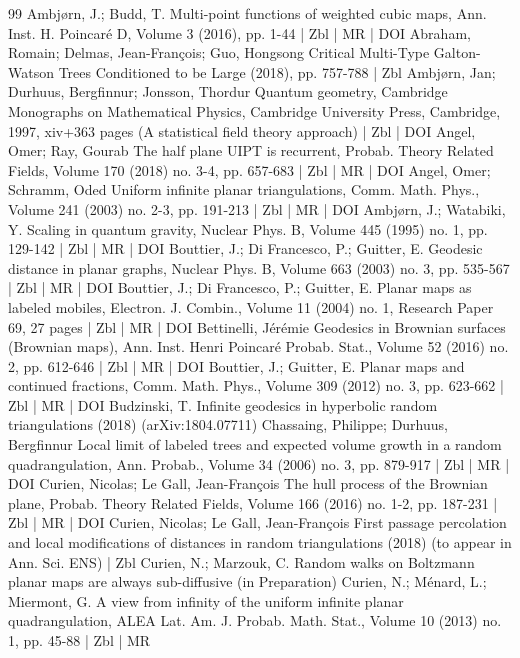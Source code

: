 \documentclass[10pt]{amsart}
\theoremstyle{definition}\newtheorem{defi}[theo]{Definition}\newtheorem{rema}[theo]{Remark}\newtheorem{exam}[theo]{Example}\newtheorem{exem}[theo]{Example}\newtheorem{nota}[theo]{Notation}
\begin{document}
\begin{thebibliography}{99}
Ambjørn, J.; Budd, T. Multi-point functions of weighted cubic maps, Ann. Inst. H. Poincaré D, Volume 3 (2016), pp. 1-44 | Zbl | MR | DOI
Abraham, Romain; Delmas, Jean-François; Guo, Hongsong Critical Multi-Type Galton-Watson Trees Conditioned to be Large (2018), pp. 757-788 | Zbl
Ambjørn, Jan; Durhuus, Bergfinnur; Jonsson, Thordur Quantum geometry, Cambridge Monographs on Mathematical Physics, Cambridge University Press, Cambridge, 1997, xiv+363 pages (A statistical field theory approach) | Zbl | DOI
Angel, Omer; Ray, Gourab The half plane UIPT is recurrent, Probab. Theory Related Fields, Volume 170 (2018) no. 3-4, pp. 657-683 | Zbl | MR | DOI
Angel, Omer; Schramm, Oded Uniform infinite planar triangulations, Comm. Math. Phys., Volume 241 (2003) no. 2-3, pp. 191-213 | Zbl | MR | DOI
Ambjørn, J.; Watabiki, Y. Scaling in quantum gravity, Nuclear Phys. B, Volume 445 (1995) no. 1, pp. 129-142 | Zbl | MR | DOI
Bouttier, J.; Di Francesco, P.; Guitter, E. Geodesic distance in planar graphs, Nuclear Phys. B, Volume 663 (2003) no. 3, pp. 535-567 | Zbl | MR | DOI
Bouttier, J.; Di Francesco, P.; Guitter, E. Planar maps as labeled mobiles, Electron. J. Combin., Volume 11 (2004) no. 1, Research Paper 69, 27 pages | Zbl | MR | DOI
Bettinelli, Jérémie Geodesics in Brownian surfaces (Brownian maps), Ann. Inst. Henri Poincaré Probab. Stat., Volume 52 (2016) no. 2, pp. 612-646 | Zbl | MR | DOI
Bouttier, J.; Guitter, E. Planar maps and continued fractions, Comm. Math. Phys., Volume 309 (2012) no. 3, pp. 623-662 | Zbl | MR | DOI
Budzinski, T. Infinite geodesics in hyperbolic random triangulations (2018) (arXiv:1804.07711)
Chassaing, Philippe; Durhuus, Bergfinnur Local limit of labeled trees and expected volume growth in a random quadrangulation, Ann. Probab., Volume 34 (2006) no. 3, pp. 879-917 | Zbl | MR | DOI
Curien, Nicolas; Le Gall, Jean-François The hull process of the Brownian plane, Probab. Theory Related Fields, Volume 166 (2016) no. 1-2, pp. 187-231 | Zbl | MR | DOI
Curien, Nicolas; Le Gall, Jean-François First passage percolation and local modifications of distances in random triangulations (2018) (to appear in Ann. Sci. ENS) | Zbl
Curien, N.; Marzouk, C. Random walks on Boltzmann planar maps are always sub-diffusive (in Preparation)
Curien, N.; Ménard, L.; Miermont, G. A view from infinity of the uniform infinite planar quadrangulation, ALEA Lat. Am. J. Probab. Math. Stat., Volume 10 (2013) no. 1, pp. 45-88 | Zbl | MR

\end{thebibliography}
\end{document}
